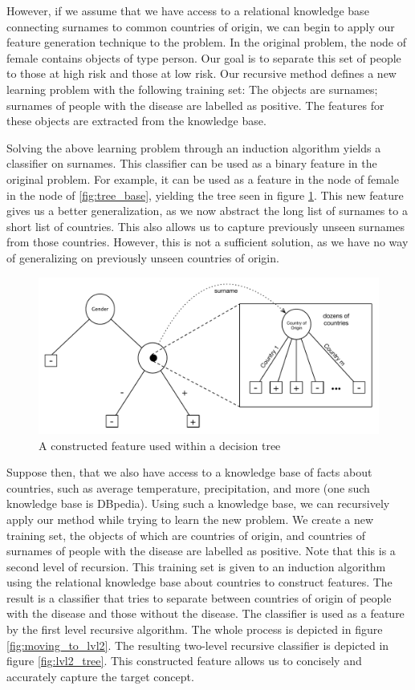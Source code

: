 \documentclass[twoside,11pt]{article}
\theoremstyle{definition}
\begin{document}
However, if we assume that we have access to a relational knowledge base connecting surnames to common countries of origin, we can begin to apply our feature generation technique to the problem. In the original problem, the node of female contains objects of type person. Our goal is to separate this set of people to those at high risk and those at low risk. Our recursive method defines a new learning problem with the following training set: The objects are surnames; surnames of people with the disease are labelled as positive. The features for these objects are extracted from the knowledge base.

Solving the above learning problem through an induction algorithm yields a classifier on surnames. This classifier can be used as a binary feature in the original problem. For example, it can be used as a feature in the node of female in the node of \ref{fig:tree_base}, yielding the tree seen in figure \ref{fig:lvl1_tree}. This new feature gives us a better generalization, as we now abstract the long list of surnames to a short list of countries. This also allows us to capture previously unseen surnames from those countries. However, this is not a sufficient solution, as we have no way of generalizing on previously unseen countries of origin.

\begin{figure}
	\centering
	\includegraphics[width=\linewidth]{fig2.pdf}
	\caption{A constructed feature used within a decision tree}
	\label{fig:lvl1_tree}
\end{figure}

Suppose then, that we also have access to a knowledge base of facts about countries, such as average temperature, precipitation, and more (one such knowledge base is DBpedia). Using such a knowledge base, we can recursively apply our method while trying to learn the new problem. We create a new training set, the objects of which are countries of origin, and countries of surnames of people with the disease are labelled as positive. Note that this is a second level of recursion. This training set is given to an induction algorithm using the relational knowledge base about countries to construct features. The result is a classifier that tries to separate between countries of origin of people with the disease and those without the disease. The classifier is used as a feature by the first level recursive algorithm. The whole process is depicted in figure \ref{fig:moving_to_lvl2}. The resulting two-level recursive classifier is depicted in figure \ref{fig:lvl2_tree}. This constructed feature allows us to concisely and accurately capture the target concept.
\end{document}
